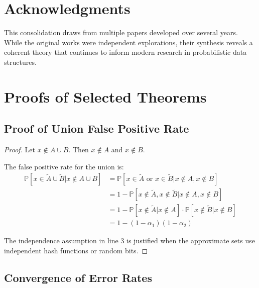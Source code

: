\documentclass[11pt]{article}
\newcommand{\observed}[1]{\tilde{#1}}  %
\newcommand{\prob}[1]{\mathbb{P}\left[#1\right]}
\newcommand{\union}{\cup}
\newcommand{\fprate}{\alpha}  %
\begin{document}
\section*{Acknowledgments}

This consolidation draws from multiple papers developed over several years. While the original works were independent explorations, their synthesis reveals a coherent theory that continues to inform modern research in probabilistic data structures.




\appendix

\section{Proofs of Selected Theorems}
\label{app:proofs}

\subsection{Proof of Union False Positive Rate}

\begin{proof}
Let $x \notin A \union B$. Then $x \notin A$ and $x \notin B$.

The false positive rate for the union is:
\begin{align}
\prob{x \in \observed{A} \union \observed{B} | x \notin A \union B}
&= \prob{x \in \observed{A} \text{ or } x \in \observed{B} | x \notin A, x \notin B} \\
&= 1 - \prob{x \notin \observed{A}, x \notin \observed{B} | x \notin A, x \notin B} \\
&= 1 - \prob{x \notin \observed{A} | x \notin A} \cdot \prob{x \notin \observed{B} | x \notin B} \\
&= 1 - (1-\fprate_1)(1-\fprate_2)
\end{align}

The independence assumption in line 3 is justified when the approximate sets use independent hash functions or random bits.
\end{proof}

\subsection{Convergence of Error Rates}
\end{document}
